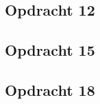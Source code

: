 \documentclass[11pt, a4paper, titlepage, openright]{article}
\begin{document}
	\subsection{Opdracht 12}
        \label{appendix:ex12}
		
	\subsection{Opdracht 15}
        \label{appendix:ex15}
		
	\subsection{Opdracht 18}
        \label{appendix:ex18}
		
\end{document}
